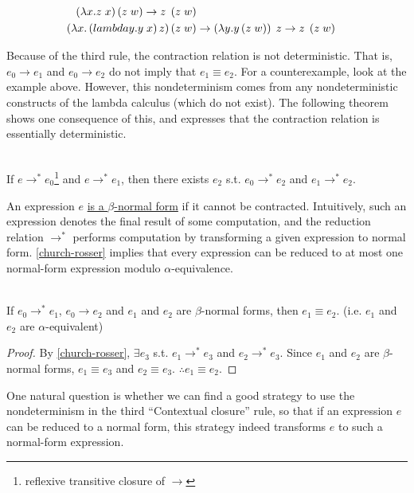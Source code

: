 \begin{enumcirc}
\begin{align*}
		\left( \lambda x. z \; x \right) \left( z \; w \right) \rightarrow
		z \; \left( z \; w \right)                                                          \\
		\left( \lambda x. \left( lambda y. y \; x \right) z \right) \left( z \; w \right) & \rightarrow
		\left( \lambda y. y \left( z \; w \right) \right) \; z \rightarrow
		z \; \left( z \; w \right)                                                          \\
	\end{align*}
	\vspace{-3em}
	\item
	Because of the third rule, the contraction relation is not deterministic.
	That is, $e_0 \rightarrow e_1$ and $e_0 \rightarrow e_2$ do not imply that $e_1
		\equiv e_2$.
	For a counterexample, look at the example above.
	However, this nondeterminism comes from any nondeterministic constructs of the
	lambda calculus (which do not exist).
	The following theorem shows one consequence of this, and expresses that the
	contraction relation is essentially deterministic.
	\begin{property}
		\label{church-rosser}
		\ \\
		If $e \rightarrow^* e_0$\footnote{ reflexive transitive closure of
			$\rightarrow$ } and $e \rightarrow^* e_1$, then there exists $e_2$ s.t. $e_0
			\rightarrow^* e_2$ and $e_1 \rightarrow^* e_2$.
	\end{property}
	\item
	An expression $e$ \ul{is a $\beta$-normal form} if it cannot be contracted.
	Intuitively, such an expression denotes the final result of some computation,
	and the reduction relation $\rightarrow^*$ performs computation by transforming
	a given expression to normal form.
	\cref{church-rosser} implies that every expression can be reduced to at most
	one normal-form expression modulo $\alpha$-equivalence.
	\begin{property}
		\ \\
		If $e_0 \rightarrow^* e_1$, $e_0 \rightarrow e_2$ and $e_1$ and $e_2$ are
		$\beta$-normal forms, then $e_1 \equiv e_2$. (i.e. $e_1$ and $e_2$ are
		$\alpha$-equivalent)
	\end{property}
	\begin{proof}
		By \cref{church-rosser}, $\exists e_3$ s.t.
		$e_1 \rightarrow^* e_3$ and $e_2 \rightarrow^* e_3$.
		Since $e_1$ and $e_2$ are $\beta$-normal forms,
		$e_1 \equiv e_3$ and $e_2 \equiv e_3$.
		$\therefore e_1 \equiv e_2$.
	\end{proof}
	\item
	One natural question is whether we can find a good strategy to use the
	nondeterminism in the third ``Contextual closure'' rule, so that if an
	expression $e$ can be reduced to a normal form, this strategy indeed transforms
	$e$ to such a normal-form expression.


\end{enumcirc}
